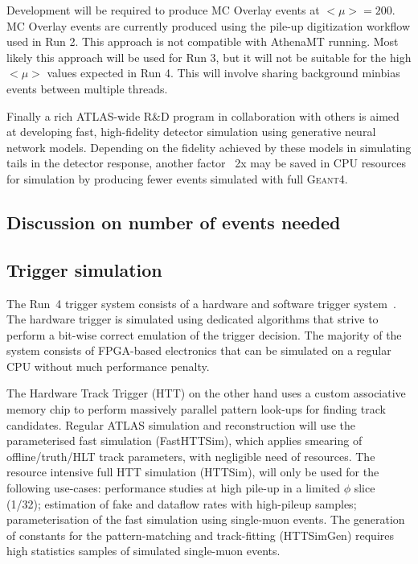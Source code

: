Development will be required to produce MC Overlay events at $<\mu>=200$. MC Overlay events are currently produced using the pile-up digitization workflow used in Run 2. This approach is not compatible with AthenaMT running. Most likely this approach will be used for Run 3, but it will not be suitable for the high $<\mu>$ values expected in Run 4. This will involve sharing background minbias events between multiple threads.

Finally a rich ATLAS-wide R\&D program in collaboration with others is aimed at developing fast, high-fidelity detector simulation using generative neural network models. Depending on the fidelity achieved by these models in simulating tails in the detector response, another factor ~2x may be saved in CPU resources for simulation by producing fewer events simulated with full G\textsc{eant}4.





\subsection{Discussion on number of events needed}

\subsection{Trigger simulation}
The Run~4 trigger system consists of a hardware and software trigger system~\cite{ATLAS-TDR-29}. The hardware trigger is simulated using dedicated algorithms that strive to perform a bit-wise correct emulation of the trigger decision. The majority of the system consists of FPGA-based electronics that can be simulated on a regular CPU without much performance penalty.

The Hardware Track Trigger (HTT) on the other hand uses a custom associative memory chip to perform massively parallel pattern look-ups for finding track candidates.
Regular ATLAS simulation and reconstruction will use the parameterised fast simulation (FastHTTSim), which applies smearing of offline/truth/HLT track parameters, with negligible need of resources. 
The resource intensive full HTT simulation (HTTSim), will only be used for the following use-cases: performance studies at high pile-up in a limited $\phi$ slice (1/32); estimation of fake and dataflow rates with high-pileup samples; parameterisation of the fast simulation using single-muon events. The generation of constants for the pattern-matching and track-fitting (HTTSimGen) requires high statistics samples of simulated single-muon events. 


